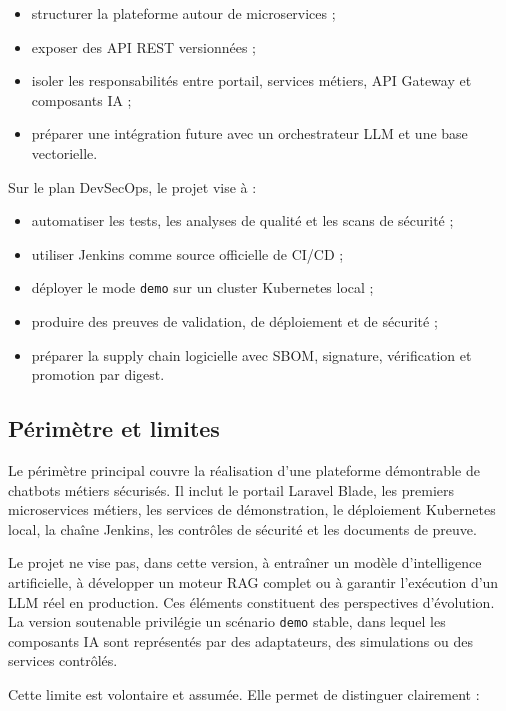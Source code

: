 \begin{itemize}
    \item structurer la plateforme autour de microservices ;
    \item exposer des API REST versionnées ;
    \item isoler les responsabilités entre portail, services métiers, API Gateway et composants IA ;
    \item préparer une intégration future avec un orchestrateur LLM et une base vectorielle.
\end{itemize}

Sur le plan DevSecOps, le projet vise à :

\begin{itemize}
    \item automatiser les tests, les analyses de qualité et les scans de sécurité ;
    \item utiliser Jenkins comme source officielle de CI/CD ;
    \item déployer le mode \texttt{demo} sur un cluster Kubernetes local ;
    \item produire des preuves de validation, de déploiement et de sécurité ;
    \item préparer la supply chain logicielle avec SBOM, signature, vérification et promotion par digest.
\end{itemize}

\subsection{Périmètre et limites}

Le périmètre principal couvre la réalisation d'une plateforme démontrable de chatbots métiers sécurisés. Il inclut le portail Laravel Blade, les premiers microservices métiers, les services de démonstration, le déploiement Kubernetes local, la chaîne Jenkins, les contrôles de sécurité et les documents de preuve.

Le projet ne vise pas, dans cette version, à entraîner un modèle d'intelligence artificielle, à développer un moteur RAG complet ou à garantir l'exécution d'un LLM réel en production. Ces éléments constituent des perspectives d'évolution. La version soutenable privilégie un scénario \texttt{demo} stable, dans lequel les composants IA sont représentés par des adaptateurs, des simulations ou des services contrôlés.

Cette limite est volontaire et assumée. Elle permet de distinguer clairement :

